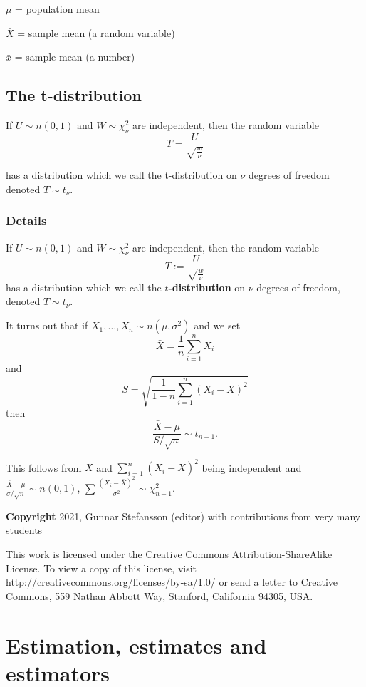 \documentclass[12pt,a4paper]{article}
\theoremstyle{regla}
\theoremstyle{remark}
\theoremstyle{definition}
\theoremstyle{nonumberbreak}
\begin{document}
$\mu$ = population mean

$\bar{X}$ = sample mean (a random variable)

$\bar{x}$ = sample mean (a number)





\subsection{The t-distribution}
\begin{fbox}
\begin{minipage}{0.97\textwidth}
If $U\sim n(0,1)$ and $W\sim\chi^{2}_{\nu}$ are independent, then the random variable $$T=\frac{U}{\sqrt{\frac{w}{\nu}}}$$

has a distribution which we call the t-distribution on $\nu$ degrees of freedom denoted $T \sim t_{\nu}$. 
\end{minipage}
\end{fbox}
\subsubsection{Details}
\begin{defn}
If $U\sim n(0,1)$ and $W\sim\chi^{2}_{\nu}$ are independent, then the
random variable 
$$
T:=\frac{U}{\sqrt{\frac{w}{\nu}}}
$$ 
has a
distribution which we call the {\bf $t$-distribution} on $\nu$ degrees of
freedom, denoted $T \sim t_\nu$. 
\end{defn}
It turns out that if
$X_1, \ldots ,X_n \sim n(\mu,\sigma ^2)$ 
and we set
$$
\bar{X}=\frac{1}{n}\sum_{i=1}^n X_i
$$ 
and 
$$
S=
\sqrt{\frac{1}{1-n}\sum_{i=1}^n (X_i-X)^2}
$$ 
then
$$
\frac{\bar{X}-\mu}{S/\sqrt{n}} \sim t_{n-1}.
$$

This follows from $\bar{X}$ and $\sum_{i=1}^n(X_i-\bar{X})^2$ being
independent and $\frac{\bar{X}-\mu}{\sigma/\sqrt{n}}\sim n(0,1)$, $\sum
\frac{(X_i-\bar{X})^2}{\sigma^2}\sim \chi_{n-1}^2$.


{\bf Copyright}
2021, Gunnar Stefansson (editor) with contributions from very many students

This work is licensed under the Creative Commons
Attribution-ShareAlike License. To view a copy of this license, visit
http://creativecommons.org/licenses/by-sa/1.0/ or send a letter to
Creative Commons, 559 Nathan Abbott Way, Stanford, California 94305,
USA.
\clearpage
\section{Estimation, estimates and estimators}
\end{document}

